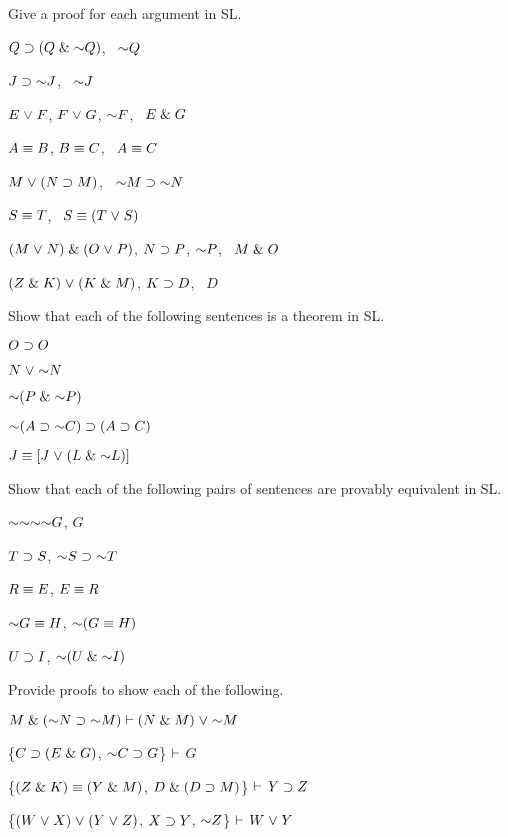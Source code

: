\problempart
Give a proof for each argument in SL.
\begin{earg}
\item $Q\eif(Q\eand\enot Q)$, \therefore\ $\enot Q$
\item $J\eif\enot J$, \therefore\ $\enot J$
\item $E\mkern1mu\vee\mkern1mu F$, $F\mkern1mu\vee\mkern1mu G$, $\enot F$, \therefore\ $E \mathrel\& G$
\item $A\equiv B$, $B\equiv C$, \therefore\ $A\equiv C$
\item $M\mkern1mu\vee\mkern1mu(N\supset M)$, \therefore\ $\enot M \eif \enot N$
\item $S\equiv T$, \therefore\ $S\equiv (T\mkern1mu\vee\mkern1mu S)$
\item $(M \mkern1mu\vee\mkern1mu N) \mathrel\& (O \mkern1mu\vee\mkern1mu P)$, $N \supset P$, $\enot P$, \therefore\ $M\mathrel\& O$
\item $(Z\mathrel\& K) \mkern1mu\vee\mkern1mu (K\mathrel\& M)$, $K \supset D$, \therefore\ $D$
\end{earg}


\solutions
\problempart
\label{pr.SLND.theorems}
Show that each of the following sentences is a theorem in SL.
\begin{earg}
\item $O \supset O$
\item $N \eor \enot N$
\item $\enot(P\eand \enot P)$
\item $\enot(A \eif \enot C) \eif (A \eif C)$
\item $J \eiff [J\eor (L\eand\enot L)]$
\end{earg}

\problempart
Show that each of the following pairs of sentences are provably equivalent in SL.
\begin{earg}
\item $\enot\enot\enot\enot G$, $G$
\item $T\supset S$, $\enot S \eif \enot T$
\item $R \equiv E$, $E \equiv R$
\item $\enot G \eiff H$, $\enot(G \eiff H)$
\item $U \supset I$, $\enot(U \eand \enot I)$
\end{earg}

\solutions
\problempart
\label{pr.solvedSLproofs2}
Provide proofs to show each of the following.
\begin{earg}
\item $M \eand (\enot N \eif \enot M) \proves (N \eand M) \eor \enot M$
\item \{$C\supset(E\mathrel\& G)$, $\enot C \eif G$\} $\vdash$ $G$
\item \{$(Z\mathrel\& K)\equiv(Y\mathrel\& M)$, $D\mathrel\&(D\supset M)$\} $\vdash$ $Y\supset Z$
\item \{$(W \mkern1mu\vee\mkern1mu X) \mkern1mu\vee\mkern1mu (Y \mkern1mu\vee\mkern1mu Z)$, $X\supset Y$, $\enot Z$\} $\vdash$ $W\mkern1mu\vee\mkern1mu Y$
\end{earg}



